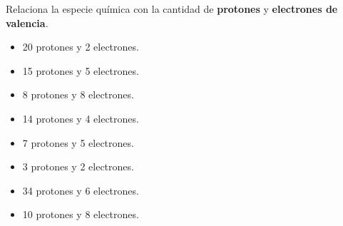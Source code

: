\question Relaciona la especie química con la cantidad de \textbf{protones} y \textbf{electrones de valencia}.\\


\begin{minipage}{0.5\textwidth}
\end{minipage}%
\begin{minipage}{0.5\textwidth}
    \begin{itemize}
        \item[\rule{1cm}{0.2mm}] 20 protones y 2 electrones.
        \item[\rule{1cm}{0.2mm}] 15 protones y 5 electrones.
        \item[\rule{1cm}{0.2mm}] 8 protones y 8 electrones.
        \item[\rule{1cm}{0.2mm}] 14 protones y 4 electrones.
        \item[\rule{1cm}{0.2mm}] 7 protones y 5 electrones.
        \item[\rule{1cm}{0.2mm}] 3 protones y 2 electrones.
        \item[\rule{1cm}{0.2mm}] 34 protones y 6 electrones.
        \item[\rule{1cm}{0.2mm}] 10 protones y 8 electrones.
    \end{itemize}
\end{minipage}